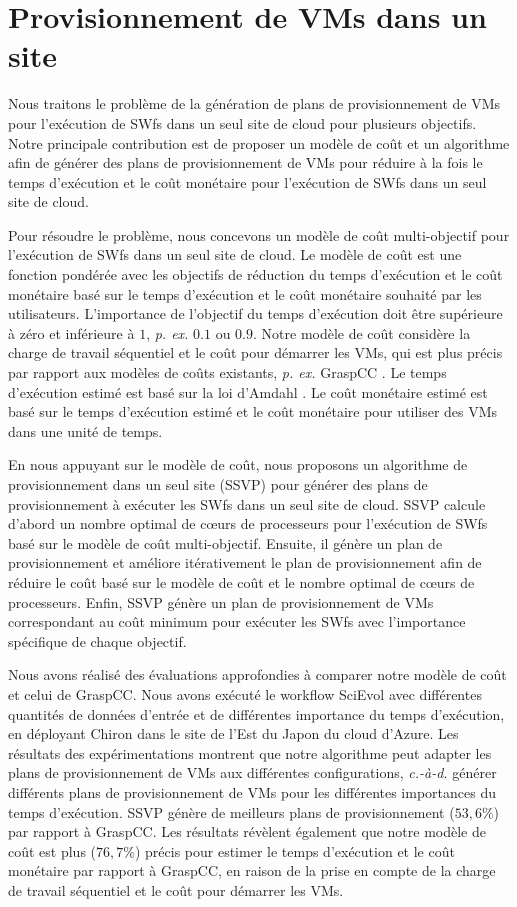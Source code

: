 \section*{Provisionnement de VMs dans un site}
Nous traitons le problème de la génération de plans de provisionnement de VMs pour l'exécution de SWfs dans un seul site de cloud pour plusieurs objectifs. Notre principale contribution est de proposer un modèle de coût et un algorithme afin de générer des plans de provisionnement de VMs pour réduire à la fois le temps d'exécution et le coût monétaire pour l'exécution de SWfs dans un seul site de cloud.

Pour résoudre le problème, nous concevons un modèle de coût multi-objectif pour l'exécution de SWfs dans un seul site de cloud. Le modèle de coût est une fonction pondérée avec les objectifs de réduction du temps d'exécution et le coût monétaire basé sur le temps d'exécution et le coût monétaire souhaité par les utilisateurs. L'importance de l'objectif du temps d'exécution doit être supérieure à zéro et inférieure à $1$, \textit{p. ex.} $0.1$ ou $0.9$. Notre modèle de coût considère la charge de travail séquentiel et le coût pour démarrer les VMs, qui est plus précis par rapport aux modèles de coûts existants, \textit{p. ex.} GraspCC \cite{Coutinho2014}. Le temps d'exécution estimé est basé sur la loi d'Amdahl \cite{Sun2013}. Le coût monétaire estimé est basé sur le temps d'exécution estimé et le coût monétaire pour utiliser des VMs dans une unité de temps.

En nous appuyant sur le modèle de coût, nous proposons un algorithme de provisionnement dans un seul site (SSVP) pour générer des plans de provisionnement à exécuter les SWfs dans un seul site de cloud. SSVP calcule d'abord un nombre optimal de cœurs de processeurs pour l'exécution de SWfs basé sur le modèle de coût multi-objectif. Ensuite, il génère un plan de provisionnement et améliore itérativement le plan de provisionnement afin de réduire le coût basé sur le modèle de coût et le nombre optimal de cœurs de processeurs. Enfin, SSVP génère un plan de provisionnement de VMs correspondant au coût minimum pour exécuter les SWfs avec l'importance spécifique de chaque objectif.

Nous avons réalisé des évaluations approfondies à comparer notre modèle de coût et celui de GraspCC. Nous avons exécuté le workflow SciEvol \cite{Ocana2012} avec différentes quantités de données d'entrée et de différentes importance du temps d'exécution, en déployant Chiron dans le site de l'Est du Japon du cloud d'Azure. Les résultats des expérimentations montrent que notre algorithme peut adapter les plans de provisionnement de VMs aux différentes configurations, \textit{c.-à-d.} générer différents plans de provisionnement de VMs pour les différentes importances du temps d'exécution. SSVP génère de meilleurs plans de provisionnement ($53,6\%$) par rapport à GraspCC. Les résultats révèlent également que notre modèle de coût est plus ($76,7\%$) précis pour estimer le temps d'exécution et le coût monétaire par rapport à GraspCC, en raison de la prise en compte de la charge de travail séquentiel et le coût pour démarrer les VMs.

